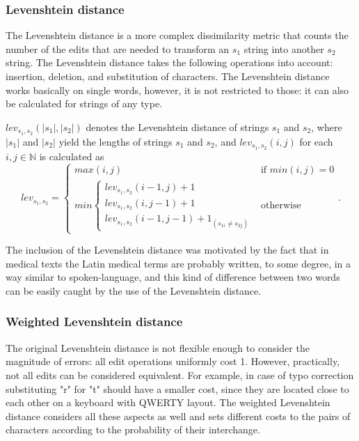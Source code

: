 \subsubsection*{Levenshtein distance}

The Levenshtein distance \cite{miller2009levenshtein, piskorski2007string} is a more complex dissimilarity metric that counts the number of the edits that are needed to transform an $s_1$ string into another $s_2$ string. The Levenshtein distance takes the following operations into account: insertion, deletion, and substitution of characters. The Levenshtein distance works basically on single words, however, it is not restricted to those: it can also be calculated for strings of any type.

$lev_{s_1,s_2}(|s_1|,|s_2|)$ denotes the Levenshtein distance of strings $s_1$ and $s_2$, where $|s_1|$ and $|s_2|$ yield the lengths of strings $s_1$ and $s_2$, and $lev_{s_1,s_2}(i,j)$ for each $i,j \in \mathbb{N}$ is calculated as
\begin{equation}
	lev_{s_1,s_2}=
	\begin{cases}
		max(i,j) & \text{if } min(i,j)=0 \\
		min \begin{cases}
		lev_{s_1,s_2}(i-1,j)+1  \\
		lev_{s_1,s_2}(i,j-1)+1  \\
		lev_{s_1,s_2}(i-1,j-1)+1_{(s_{1i} \neq s_{2j})} 
	\end{cases} & \text{otherwise}
	\end{cases}.
	\label{eq:levenshtein}
\end{equation}

The inclusion of the Levenshtein distance was motivated by the fact that in medical texts the Latin medical terms are probably written, to some degree, in a way similar to spoken-language, and this kind of difference between two words can be easily caught by the use of the Levenshtein distance.

\subsubsection*{Weighted Levenshtein distance}

The original Levenshtein distance is not flexible enough to consider the magnitude of errors: all edit operations uniformly cost 1. However, practically, not all edits can be considered equivalent. For example, in case of typo correction substituting "r" for "t" should have a smaller cost, since they are located close to each other on a keyboard with QWERTY layout. The weighted Levenshtein distance considers all these aspects as well and sets different costs to the pairs of characters according to the probability of their interchange.

